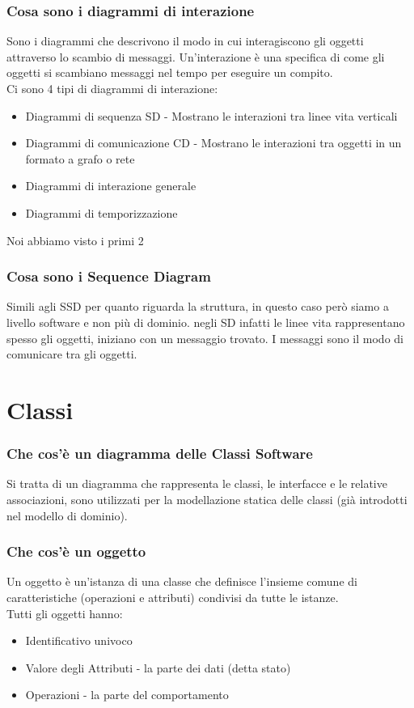 \documentclass[12pt, a4paper, openany]{book}
\begin{document}
\subsection*{Cosa sono i diagrammi di interazione}
Sono i diagrammi che descrivono il modo in cui interagiscono gli oggetti
attraverso lo scambio di messaggi. Un'interazione è una specifica di come gli oggetti
si scambiano messaggi nel tempo per eseguire un compito.\\
Ci sono 4 tipi di diagrammi di interazione:
\begin{itemize}
    \item Diagrammi di sequenza SD - Mostrano le interazioni tra linee vita verticali
    \item Diagrammi di comunicazione CD - Mostrano le interazioni tra oggetti in un formato a grafo o rete
    \item Diagrammi di interazione generale
    \item Diagrammi di temporizzazione
\end{itemize}
Noi abbiamo visto i primi 2

\subsection*{Cosa sono i Sequence Diagram}
Simili agli SSD per quanto riguarda la struttura, in questo caso però siamo a livello
software e non più di dominio. negli SD infatti le linee vita rappresentano spesso 
gli oggetti, iniziano con un messaggio trovato. I messaggi sono il modo di comunicare tra
gli oggetti.

\chapter{Classi}

\subsection*{Che cos'è un diagramma delle Classi Software}
Si tratta di un diagramma che rappresenta le classi, le interfacce e le relative associazioni,
sono utilizzati per la modellazione statica delle classi (già introdotti nel modello di
dominio).

\subsection*{Che cos'è un oggetto}
Un oggetto è un'istanza di una classe che definisce l'insieme comune di
caratteristiche (operazioni e attributi) condivisi da tutte le istanze.\\
Tutti gli oggetti hanno:
\begin{itemize}
    \item Identificativo univoco
    \item Valore degli Attributi - la parte dei dati (detta stato)
    \item Operazioni - la parte del comportamento
\end{itemize}
\end{document}
